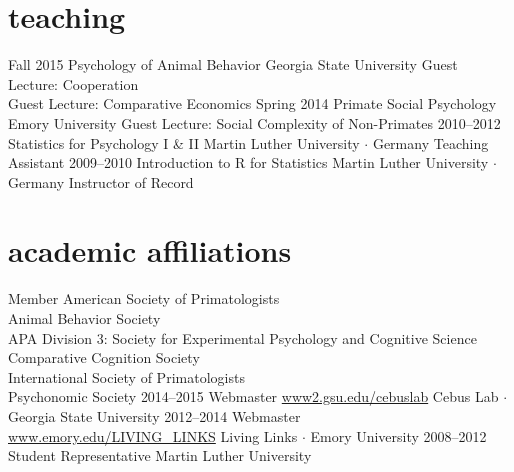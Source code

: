 \documentclass[]{friggeri-cv}
\begin{document}
\section{teaching}

\begin{entrylist}
  \entry
    {Fall 2015}
    {Psychology of Animal Behavior}
    {Georgia State University}
    {Guest Lecture: Cooperation\\
    Guest Lecture: Comparative Economics}
  \entry
    {Spring 2014}
    {Primate Social Psychology}
    {Emory University}
    {Guest Lecture: Social Complexity of Non-Primates}
  \entry
    {2010--2012}
    {Statistics for Psychology I \& II}
    {Martin Luther University $\cdot$ Germany}
    {Teaching Assistant}
  \entry
    {2009--2010}
    {Introduction to R for Statistics}
    {Martin Luther University $\cdot$ Germany}
    {Instructor of Record}
\end{entrylist}


\newpage
\thispagestyle{fancy}

\section{academic affiliations}

\begin{entrylist}
  \entry
    {}
    {Member}
    {}
    {
    American Society of Primatologists\\
    Animal Behavior Society\\
    APA Division 3: Society for Experimental Psychology and Cognitive Science\\
    Comparative Cognition Society\\
    International Society of Primatologists\\
    Psychonomic Society
    }
  \entry
    {2014--2015}
    {Webmaster}
    {\href{http://www2.gsu.edu/cebuslab}{www2.gsu.edu/cebuslab}}
    {Cebus Lab $\cdot$ Georgia State University}
  \entry
    {2012--2014}
    {Webmaster}
    {\href{http://www.emory.edu/LIVING_LINKS}{www.emory.edu/LIVING\_LINKS}}
    {Living Links $\cdot$ Emory University}
  \entry
    {2008--2012}
    {Student Representative}
    {}
    {Martin Luther University}
\end{entrylist}
\end{document}
